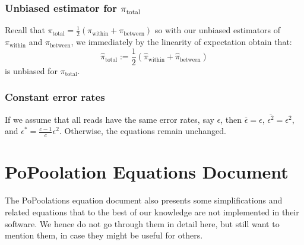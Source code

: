 \documentclass[a4paper,fontsize=9pt,DIV=14]{scrartcl}
\newcounter{todo}
\newcommand\todo[1]{}
\newcommand*{\piw}{$\pi_\text{within}$\xspace}
\def\mathpiw{\pi_\text{within}}
\newcommand*{\pib}{$\pi_\text{between}$\xspace}
\def\mathpib{\pi_\text{between}}
\newcommand*{\pit}{$\pi_\text{total}$\xspace}
\def\mathpit{\pi_\text{total}}
\begin{document}

\subsubsection*{Unbiased estimator for \pit}
\label{supp:sec:FST:sub:HeterozygositySequencingError:sub:UnbiasedPIT}

Recall that $\mathpit = \frac{1}{2}\left(\mathpiw + \mathpib\right)$ so with our unbiased estimators of \piw and \pib, we immediately by the linearity of expectation obtain that:
\[
\widehat{\pi}_\text{total} := \frac{1}{2}\left(\widehat{\pi}_\text{within} + \widehat{\pi}_\text{between}\right)
\]
is unbiased for \pit.


\subsubsection*{Constant error rates}
\label{supp:sec:FST:sub:HeterozygositySequencingError:sub:ConstErr}

If we assume that all reads have the same error rates, say $\epsilon$, then $\overline{\epsilon} = \epsilon$, $\overline{\epsilon^2} = \epsilon^2$, and $\epsilon^* = \frac{c-1}{c}\epsilon^2$.  Otherwise, the equations remain unchanged.



\section{PoPoolation Equations Document}
\label{supp:sec:PoPoolation2Equations}

The PoPoolations equation document also presents some simplifications and related equations that to the best of our knowledge are not implemented in their software.
We hence do not go through them in detail here, but still want to mention them, in case they might be useful for others.
\end{document}
